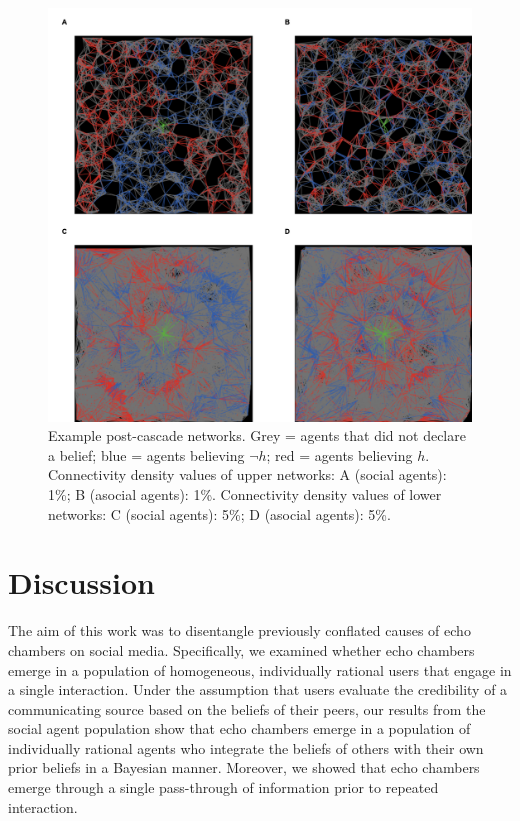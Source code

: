 \documentclass[doc,floatsintext]{apa6}
\begin{document}
\begin{figure}[!t]
\centering
\includegraphics[width=1\columnwidth]{img/example_networks.png}
\caption{Example post-cascade networks. Grey = agents that did not declare a belief; blue = agents believing \(\neg h\); red = agents believing \(h\). Connectivity density values of upper networks: A (social agents): 1\%; B (asocial agents): 1\%. Connectivity density values of lower networks: C (social agents): 5\%; D (asocial agents): 5\%.} 
\label{fig:rich_vis}
\end{figure}


\section{Discussion}
The aim of this work was to disentangle previously conflated causes of echo chambers on social media. Specifically, we examined whether echo chambers emerge in a population of homogeneous, individually rational users that engage in a single interaction. Under the assumption that users evaluate the credibility of a communicating source based on the beliefs of their peers, our results from the social agent population show that echo chambers emerge in a population of individually rational agents who integrate the beliefs of others with their own prior beliefs in a Bayesian manner. Moreover, we showed that echo chambers emerge through a single pass-through of information prior to repeated interaction.
\end{document}
